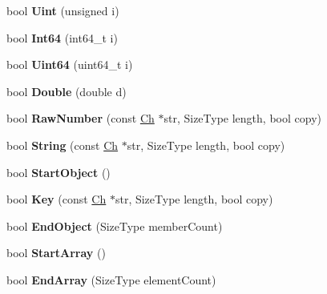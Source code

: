 \begin{DoxyCompactItemize}
bool {\bfseries Uint} (unsigned i)
\item 
\mbox{\label{classGenericDocument_a934b1b7a7ed89917615a5410db77a942}} 
bool {\bfseries Int64} (int64\+\_\+t i)
\item 
\mbox{\label{classGenericDocument_a50ac3451a1afd0ce248dcc023d5e09e8}} 
bool {\bfseries Uint64} (uint64\+\_\+t i)
\item 
\mbox{\label{classGenericDocument_a934bf7a5d1ff062ab079756d842e4f6b}} 
bool {\bfseries Double} (double d)
\item 
\mbox{\label{classGenericDocument_af703994dec5af6ef049a24b5243aceab}} 
bool {\bfseries Raw\+Number} (const \hyperlink{classGenericValue_ade0e0ce64ccd5d852da57a35e720bafb}{Ch} $\ast$str, Size\+Type length, bool copy)
\item 
\mbox{\label{classGenericDocument_ad319fcc9e13606b6795424b9374a7398}} 
bool {\bfseries String} (const \hyperlink{classGenericValue_ade0e0ce64ccd5d852da57a35e720bafb}{Ch} $\ast$str, Size\+Type length, bool copy)
\item 
\mbox{\label{classGenericDocument_abb1417fde52cc34cb340e3b50a3295da}} 
bool {\bfseries Start\+Object} ()
\item 
\mbox{\label{classGenericDocument_a600d0950baabbcab11197cacb1459c7a}} 
bool {\bfseries Key} (const \hyperlink{classGenericValue_ade0e0ce64ccd5d852da57a35e720bafb}{Ch} $\ast$str, Size\+Type length, bool copy)
\item 
\mbox{\label{classGenericDocument_a42f2df68f9c9d8b88a15b609716867d9}} 
bool {\bfseries End\+Object} (Size\+Type member\+Count)
\item 
\mbox{\label{classGenericDocument_ae12c513c61745ae731a47b1ca33db063}} 
bool {\bfseries Start\+Array} ()
\item 
\mbox{\label{classGenericDocument_a14097c833bed1a9c7be064ea619c887f}} 
bool {\bfseries End\+Array} (Size\+Type element\+Count)
\end{DoxyCompactItemize}
